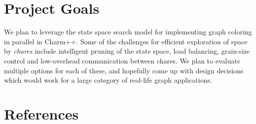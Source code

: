 \documentclass[10pt,twoside]{article}
\begin{document}
\section{Project Goals}
   We plan to leverage the state space search model for implementing graph coloring in parallel in Charm++. Some of the challenges for efficient exploration of space by \textit{chares} include intelligent pruning of the state space, load balancing, grain-size control and low-overhead communication between chares. We plan to evaluate multiple options for each of these, and hopefully come up with design decisions which would work for a large category of real-life graph applications.
	
\section{References}

\nocite{*}

\end{document}
